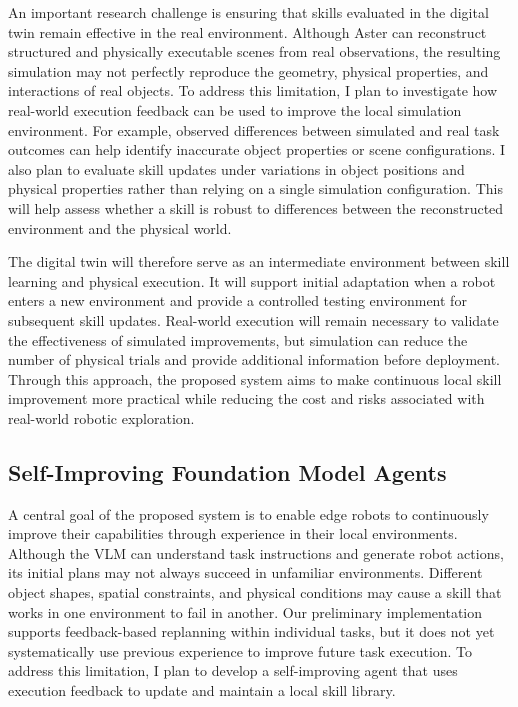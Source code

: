 \documentclass[11pt]{article}
\begin{document}
An important research challenge is ensuring that skills evaluated in the digital twin remain effective in the real environment. Although Aster can reconstruct structured and physically executable scenes from real observations, the resulting simulation may not perfectly reproduce the geometry, physical properties, and interactions of real objects. To address this limitation, I plan to investigate how real-world execution feedback can be used to improve the local simulation environment. For example, observed differences between simulated and real task outcomes can help identify inaccurate object properties or scene configurations. I also plan to evaluate skill updates under variations in object positions and physical properties rather than relying on a single simulation configuration. This will help assess whether a skill is robust to differences between the reconstructed environment and the physical world.

The digital twin will therefore serve as an intermediate environment between skill learning and physical execution. It will support initial adaptation when a robot enters a new environment and provide a controlled testing environment for subsequent skill updates. Real-world execution will remain necessary to validate the effectiveness of simulated improvements, but simulation can reduce the number of physical trials and provide additional information before deployment. Through this approach, the proposed system aims to make continuous local skill improvement more practical while reducing the cost and risks associated with real-world robotic exploration.

\FloatBarrier
\subsection{Self-Improving Foundation Model Agents}
\label{subsec:fm_agents}

A central goal of the proposed system is to enable edge robots to continuously improve their capabilities through experience in their local environments. Although the VLM can understand task instructions and generate robot actions, its initial plans may not always succeed in unfamiliar environments. Different object shapes, spatial constraints, and physical conditions may cause a skill that works in one environment to fail in another. Our preliminary implementation supports feedback-based replanning within individual tasks, but it does not yet systematically use previous experience to improve future task execution. To address this limitation, I plan to develop a self-improving agent that uses execution feedback to update and maintain a local skill library.
\end{document}
